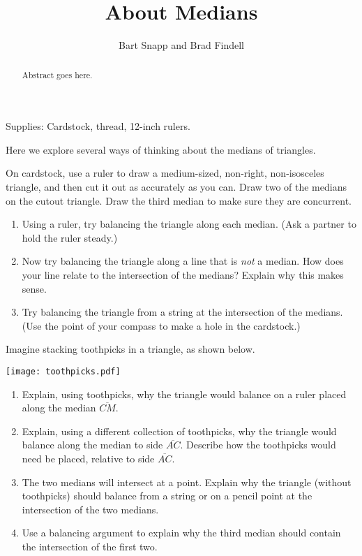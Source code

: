 \documentclass{ximera}
\title{About Medians}
\author{Bart Snapp and Brad Findell}
\begin{document}
\begin{abstract}
Abstract goes here.  
\end{abstract}
\maketitle

\begin{teachingnote}
Supplies:  Cardstock, thread, 12-inch rulers.
\end{teachingnote}

Here we explore several ways of thinking about the medians of triangles.  

\begin{problem}  
On cardstock, use a ruler to draw a medium-sized, non-right, non-isosceles triangle, and then cut it out as accurately as you can.  Draw two of the medians on the cutout triangle.  Draw the third median to make sure they are concurrent.  
\begin{enumerate}
\item Using a ruler, try balancing the triangle along each median.  (Ask a partner to hold the ruler steady.)  
\item Now try balancing the triangle along a line that is \emph{not} a median.  How does your line relate to the intersection of the medians?  Explain why this makes sense.  
\item Try balancing the triangle from a string at the intersection of the medians.  (Use the point of your compass to make a hole in the cardstock.)
\end{enumerate}

\end{problem}

\begin{problem}
Imagine stacking toothpicks in a triangle, as shown below.  

\begin{image}
\texttt{[image: toothpicks.pdf]}
\end{image}

\begin{enumerate}
\item Explain, using toothpicks, why the triangle would balance on a ruler placed along the median $\overline{CM}$.  
\item Explain, using a different collection of toothpicks, why the triangle would balance along the median to side $\overline{AC}$.  Describe how the toothpicks would need be placed, relative to side $\overline{AC}$.
\item The two medians will intersect at a point.  Explain why the triangle (without toothpicks) should balance from a string or on a pencil point at the intersection of the two medians.  
\item Use a balancing argument to explain why the third median should contain the intersection of the first two.  
\end{enumerate}
\end{problem}
\end{document}

